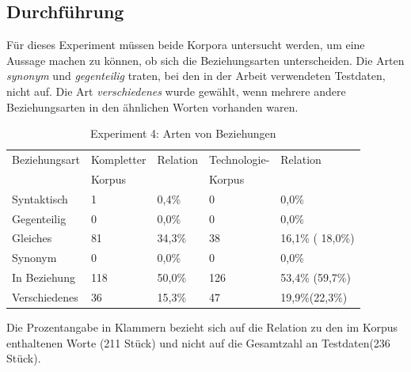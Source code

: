 \documentclass[12pt,a4paper]{report}
\begin{document}
		\subsection{Durchführung}
		Für dieses Experiment müssen beide Korpora untersucht werden, um eine Aussage machen zu können, ob sich die Beziehungsarten unterscheiden. Die Arten \textit{synonym} und \textit{gegenteilig} traten, bei den in der Arbeit verwendeten Testdaten, nicht auf. Die Art \textit{verschiedenes} wurde gewählt, wenn mehrere andere Beziehungsarten in den ähnlichen Worten vorhanden waren.
		
\begin{table}[H]
\caption{Experiment 4: Arten von Beziehungen}
\begin{center}
\begin{tabular}{|l||l|l||l|l|}
\hline
Beziehungsart	& Kompletter	& Relation & Technologie-  & Relation\\
 				& Korpus 		& 		   & Korpus		& \\

\hline
 Syntaktisch & 1 &  0,4\%	& 0 & 0,0\% \\
 \hline
 Gegenteilig & 0 & 0,0\% 	& 0 & 0,0\% \\
 \hline
 Gleiches & 81 & 34,3\% 	& 38 & 16,1\% ( 18,0\%) \\
 \hline
 Synonym & 0 & 0,0\% 	& 0 & 0,0\% \\
 \hline
 In Beziehung & 118 & 50,0\% 	& 126 & 53,4\% (59,7\%)\\
 \hline
 Verschiedenes & 36 & 15,3\% 	& 47 & 19,9\%(22,3\%) \\
 \hline
 
\end{tabular}
\end{center}
\end{table}
		
		Die Prozentangabe in Klammern bezieht sich auf die Relation zu den im Korpus enthaltenen Worte (211 Stück) und nicht auf die Gesamtzahl an Testdaten(236 Stück).\\
		
\end{document}
